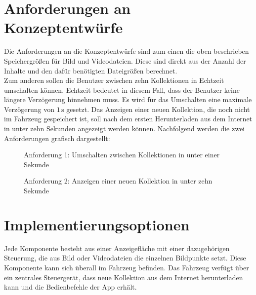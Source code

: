 \section{Anforderungen an Konzeptentwürfe}
Die Anforderungen an die Konzeptentwürfe sind zum einen die oben beschrieben Speichergrößen für Bild und Videodateien. Diese sind direkt aus der Anzahl der Inhalte und den dafür benötigten Dateigrößen berechnet. \\
Zum anderen sollen die Benutzer zwischen zehn Kollektionen in Echtzeit umschalten können. Echtzeit bedeutet in diesem Fall, dass der Benutzer keine längere Verzögerung hinnehmen muss. Es wird für das Umschalten eine maximale Verzögerung von $ 1\,\mathrm{s} $ gesetzt.
Das Anzeigen einer neuen Kollektion, die noch nicht im Fahrzeug gespeichert ist, soll nach dem ersten Herunterladen aus dem Internet in unter zehn Sekunden angezeigt werden können.
Nachfolgend werden die zwei Anforderungen grafisch dargestellt:
\begin{figure}[hbt]
	\centering
	
	\caption[Anforderung 1: Umschalten zwischen Kollektionen in unter einer Sekunde]{Anforderung 1: Umschalten zwischen Kollektionen in unter einer Sekunde}
	\label{fig:anforderung1}
\end{figure}
\begin{figure}[hbt]
	\centering
	
	\caption[Anforderung 2: Anzeigen einer neuen Kollektion in unter zehn Sekunde]{Anforderung 2: Anzeigen einer neuen Kollektion in unter zehn Sekunde}
	\label{fig:anforderung2}
\end{figure}
\section{Implementierungsoptionen}
Jede Komponente besteht aus einer Anzeigefläche mit einer dazugehörigen Steuerung, die aus Bild oder Videodateien die einzelnen Bildpunkte setzt. Diese Komponente kann sich überall im Fahrzeug befinden.
Das Fahrzeug verfügt über ein zentrales Steuergerät, dass neue Kollektion aus dem Internet herunterladen kann und die Bedienbefehle der App erhält.
